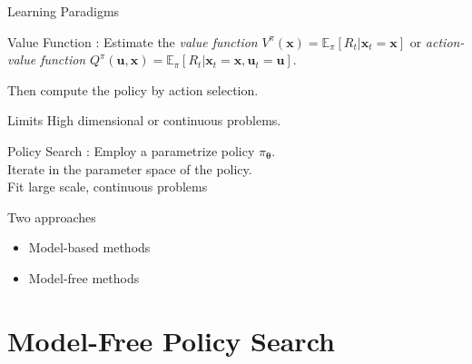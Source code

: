 \documentclass[10pt]{beamer}
\begin{document}
\begin{frame}{Learning Paradigms}

\begin{exampleblock}{Value Function :}
Estimate the \emph{value function} $V^\pi(\bm{x}) = \mathbb{E}_\pi [R_t | \bm{x}_t = \bm{x}]$
or \emph{action-value function} $Q^\pi(\bm{u}, \bm{x}) = \mathbb{E}_\pi [R_t | \bm{x}_t = \bm{x},  \bm{u}_t = \bm{u}]$.

Then compute the policy by action selection.
\end{exampleblock}

\begin{alertblock}{Limits}
High dimensional or continuous problems.\\
\end{alertblock}

\vspace{1em}
\begin{exampleblock}{Policy Search :}
Employ a parametrize policy $\pi_{\bm{\theta}}$. \\
Iterate in the parameter space of the policy. \\
Fit large scale, continuous problems
\end{exampleblock}
\begin{alertblock}{Two approaches}
\begin{itemize}
\item Model-based methods
\item Model-free methods
\end{itemize}

\end{alertblock}

\end{frame}




\section{Model-Free Policy Search}
\end{document}
